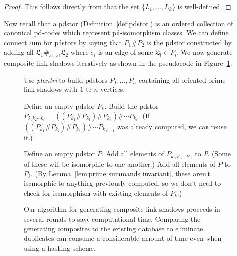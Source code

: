 \documentclass[amsmath,secnumarabic,floatfix,amssymb,nofootinbib,nobibnotes,letterpaper,11pt,tightenlines,showkeys]{revtex4}
\theoremstyle{definition}
\let\mgp=\marginpar \marginparwidth18mm \marginparsep1mm
\def\marginpar#1{\mgp{\raggedright\tiny #1}}
\let\lbl=\label
\def\label#1{\lbl{#1}\ifinner\else\marginpar{\ref{#1} #1}\ignorespaces\fi}
\begin{document}
\begin{proof} This follows directly from that the set $\{L_1, \dots, L_k\}$ is well-defined. \end{proof}

Now recall that a pdstor (Definition~\ref{def:pdstor}) is an ordered collection of canonical pd-codes which represent pd-isomorphism classes. We can define connect sum for pdstors by saying that $P_1 \# P_2$ is the pdstor constructed by adding all $\mathfrak{L_1} \#_{e1,e2} \mathfrak{L_2}$ where $e_i$ is an edge of some $\mathfrak{L_i} \in P_i$. We now generate composite link shadows iteratively as shown in the pseudocode in Figure~\ref{alg:build composites}.

\begin{figure}[ht]
\begin{algorithmic}

\State Use \emph{plantri} to build pdstors $P_1, \dots, P_n$ containing all oriented prime link shadows with $1$ to $n$ vertices.


 \State Define an empty pdstor $P_k$.
    \State  Build the pdstor $P_{k_1k_2\cdots k_\ell} = ((P_{k_1} \# P_{k_2}) \# P_{k_3}) \# \cdots P_{k_\ell}$.
    \State  (If $((P_{k_1} \# P_{k_2}) \# P_{k_3}) \# \cdots P_{k_{\ell-1}}$ was already computed, we can reuse it.)
 \EndFor

    \State Define an empty pdstor $P$.
       \State Add all elements of $P_{k'_1k'_2\cdots k'_\ell}$ to $P$.
      \State (Some of these will be isomorphic to one another.)
    \EndFor
    \State Add all elements of $P$ to $P_k$.
    \State (By Lemma~\ref{lem:prime summands invariant}, these aren't isomorphic to anything previously computed,
    \State so we don't need to check for isomorphism with existing elements of $P_k$.)
 \EndFor

\EndFor
\EndProcedure
\end{algorithmic}
\caption{Our algorithm for generating composite link shadows proceeds in several rounds to save computational time. Comparing the generating composites to the existing database to eliminate duplicates can consume a considerable amount of time even when using a hashing scheme.}
\label{alg:build composites}
\end{figure}
\end{document}
